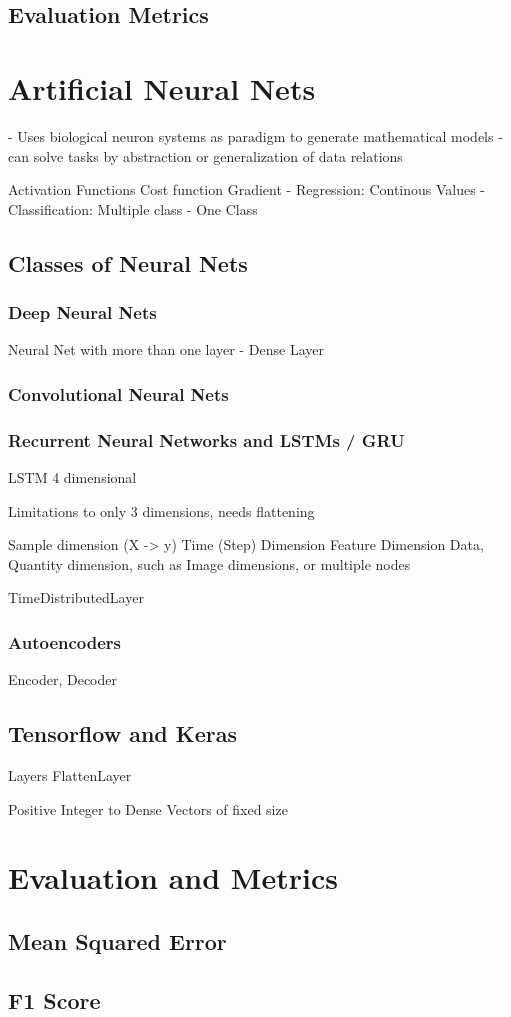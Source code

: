 \subsection{Evaluation Metrics}
\section{Artificial Neural Nets}

- Uses biological neuron systems as paradigm to generate mathematical models
- can solve tasks by abstraction or generalization of data relations


Activation Functions
Cost function
Gradient
- Regression: Continous Values
- Classification: Multiple class
- One Class

\subsection{Classes of Neural Nets}

\subsubsection{Deep Neural Nets}

Neural Net with more than one layer
- Dense Layer

\subsubsection{Convolutional Neural Nets}
\subsubsection{Recurrent Neural Networks and LSTMs / GRU}
LSTM 4 dimensional

Limitations to only 3 dimensions, needs flattening

Sample dimension (X -> y)
Time (Step) Dimension
Feature Dimension
Data, Quantity dimension, such as Image dimensions, or multiple nodes

TimeDistributedLayer

\subsubsection{Autoencoders}

Encoder, Decoder

\subsection{Tensorflow and Keras}
Layers
FlattenLayer

Positive Integer to Dense Vectors of fixed size

\section{Evaluation and Metrics}
\subsection{Mean Squared Error}
\subsection{F1 Score}
